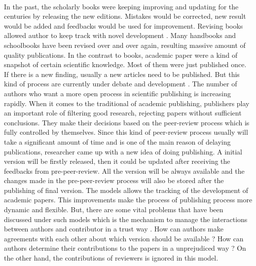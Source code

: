 \documentclass [12pt]{article}
\begin{document}
\paragraph{}In the past, the scholarly books were keeping improving and updating for the centuries by releasing the new editions. 
Mistakes would be corrected, new result would be added and feedbacks would be used for improvement. 
Revising books allowed author to keep track with novel development \cite{heller2014dynamic}. 
Many handbooks and schoolbooks have been revised over and over again, resulting massive amount of quality publications.
In the contrast to books, academic paper were a kind of snapshot of certain scientific knowledge. 
Most of them were just published once. If there is a new finding, usually a new articles need to be published. 
But this kind of process are currently under debate and development \cite{heller2014dynamic}. 
The number of authors who want a more open process in scientific publishing is increasing rapidly. 
When it comes to the traditional of academic publishing, 
publishers play an important role of filtering good research, rejecting papers 
without sufficient conclusions. 
They make their decisions based on the peer-review process which is fully controlled by themselves. 
Since this kind of peer-review process usually will take a significant amount of time and is one of the
main reason of delaying publications, researcher came up with a new idea of doing publishing. A initial version
will be firstly released, then it could be updated after receiving the feedbacks from pre-peer-review. 
All the version will be always available and the changes made in the pre-peer-review process will also be stored after the publishing of final version.
The models allows the tracking of the development of academic papers. 
This improvements make the process of publishing process more dynamic and flexible.
But, there are some vital problems that have been discussed under such models 
which is the mechanism to manage the interactions between authors and contributor in a trust way \cite{Khoe:1994:CML:2288694.2294265}.
How can authors make agreements with each other about which version should be available ?
How can authors determine their contributions to the papers in a unprejudiced way ? On the other hand,
the contributions of reviewers is ignored in this model.
\end{document}
